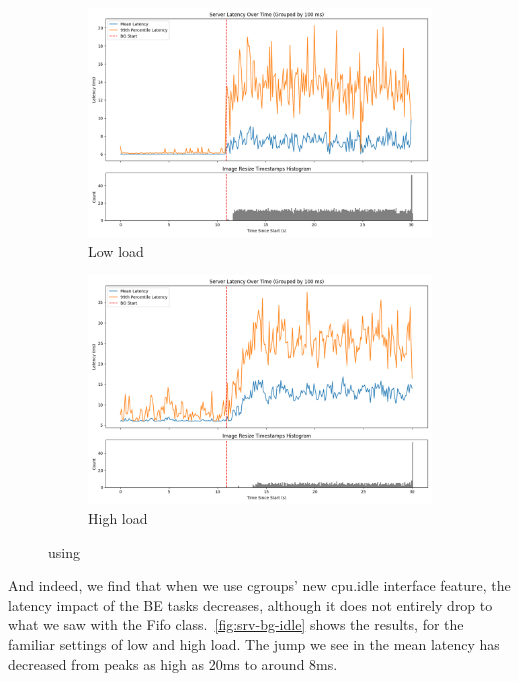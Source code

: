 \begin{figure}[t]
    \centering
    \begin{subfigure}[t]{0.49\columnwidth}
        \includegraphics[width=\columnwidth]{graphs/srv-bg-idle-low.png}
        \caption{Low load}\label{fig:srv-bg-idle-low}
    \end{subfigure}
    \hspace{\fill}
    \begin{subfigure}[t]{0.49\columnwidth}
        \includegraphics[width=\columnwidth]{graphs/srv-bg-idle-high.png}
        \caption{High load}\label{fig:srv-bg-idle-high}
    \end{subfigure}
    \vspace{4pt}
    \caption{using \schedidle{}}\label{fig:srv-bg-idle}
\end{figure}

And indeed, we find that when we use cgroups' new cpu.idle interface feature,
the latency impact of the BE tasks decreases, although it does not entirely drop
to what we saw with the Fifo class.\ \autoref{fig:srv-bg-idle} shows the
results, for the familiar settings of low and high load. The jump we see in the
mean latency has decreased from peaks as high as 20ms to around 8ms.